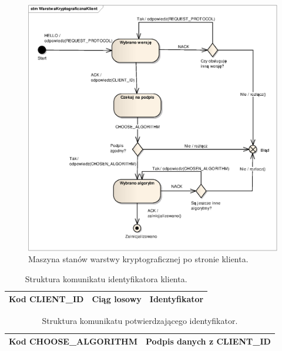 \begin{figure}[h]
  \caption{Maszyna stanów warstwy kryptograficznej po stronie klienta.}
  \label{fig:kryptoKlient}
  \centering
\includegraphics[width=1\textwidth]{img/kryptoKlient}
\end{figure}

\begin{table}[H]
\centering
\caption{Struktura komunikatu identyfikatora klienta.}

\begin{tabular}{|p{3cm}|p{3cm}|p{6cm}|}
\hline
Kod CLIENT\_ID & Ciąg losowy & Identyfikator\\
\hline
\end{tabular}
\end{table}

\begin{table}[H]
\centering
\caption{Struktura komunikatu potwierdzającego identyfikator.}

\begin{tabular}{|p{6cm}|p{6cm}|}
\hline
Kod CHOOSE\_ALGORITHM & Podpis danych z CLIENT\_ID\\
\hline
\end{tabular}
\end{table}

